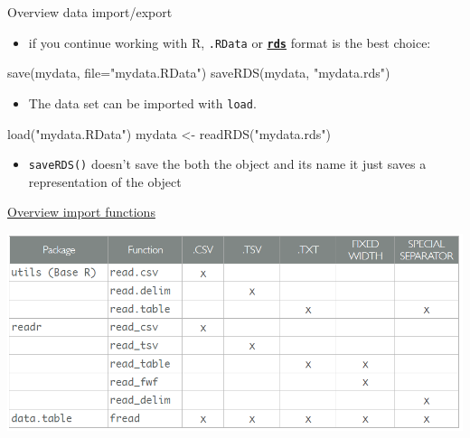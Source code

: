 \documentclass[
  10pt,
  ignorenonframetext,
]{beamer}
\newenvironment{Shaded}{\begin{snugshade}}{\end{snugshade}}
\newcommand{\DataTypeTok}[1]{\textcolor[rgb]{0.87,0.87,0.75}{#1}}
\newcommand{\KeywordTok}[1]{\textcolor[rgb]{0.94,0.87,0.69}{#1}}
\newcommand{\NormalTok}[1]{\textcolor[rgb]{0.80,0.80,0.80}{#1}}
\newcommand{\StringTok}[1]{\textcolor[rgb]{0.80,0.58,0.58}{#1}}
\providecommand{\tightlist}{%
  \setlength{\itemsep}{0pt}\setlength{\parskip}{0pt}}
\begin{document}
\begin{frame}[fragile]{Overview data import/export}
\protect\hypertarget{overview-data-importexport}{}

\begin{itemize}
\tightlist
\item
  if you continue working with R, \texttt{.RData} or
  \href{https://www.fromthebottomoftheheap.net/2012/04/01/saving-and-loading-r-objects/}{\textbf{\texttt{rds}}}
  format is the best choice:
\end{itemize}

\begin{Shaded}
\begin{Highlighting}[]
\KeywordTok{save}\NormalTok{(mydata, }\DataTypeTok{file=}\StringTok{"mydata.RData"}\NormalTok{)}
\KeywordTok{saveRDS}\NormalTok{(mydata, }\StringTok{"mydata.rds"}\NormalTok{)}
\end{Highlighting}
\end{Shaded}

\begin{itemize}
\tightlist
\item
  The data set can be imported with \texttt{load}.
\end{itemize}

\begin{Shaded}
\begin{Highlighting}[]
\KeywordTok{load}\NormalTok{(}\StringTok{"mydata.RData"}\NormalTok{)}
\NormalTok{mydata <-}\StringTok{ }\KeywordTok{readRDS}\NormalTok{(}\StringTok{"mydata.rds"}\NormalTok{)}
\end{Highlighting}
\end{Shaded}

\begin{itemize}
\tightlist
\item
  \texttt{saveRDS()} doesn't save the both the object and its name it
  just saves a representation of the object
\end{itemize}

\end{frame}

\begin{frame}{\href{http://uc-r.github.io/data_wrangling/week-2}{Overview
import functions}}
\protect\hypertarget{overview-import-functions}{}

\includegraphics{figure/overviewimportfunctions.PNG}

\end{frame}
\end{document}
